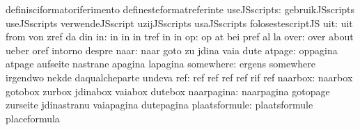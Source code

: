                                   definisciformatoriferimento      definesteformatreferinte
                    useJSscripts: gebruikJSscripts                 useJSscripts
                                  verwendeJSscript                 uzijJSscripts
                                  usaJSscripts                     folosestescriptJS
                             uit: uit                              from
                                  von                              zref
                                  da                               din
                              in: in                               in
                                  in                               tref
                                  in                               in
                              op: op                               at
                                  bei                              pref
                                  al                               la %
                            over: over                             about
                                  ueber                            oref
                                  intorno                          despre
                            naar: naar                             goto
                                  zu                               jdina
                                  vaia                             dute
                          atpage: oppagina                         atpage
                                  aufseite                         nastrane
                                  apagina                          lapagina
                       somewhere: ergens                           somewhere
                                  irgendwo                         nekde
                                  daqualcheparte                   undeva
                             ref: ref                              ref
                                  ref                              ref
                                  rif                              ref
                         naarbox: naarbox                          gotobox
                                  zurbox                           jdinabox
                                  vaiabox                          dutebox  %
                      naarpagina: naarpagina                       gotopage
                                  zurseite                         jdinastranu
                                  vaiapagina                       dutepagina
                   plaatsformule: plaatsformule                    placeformula

